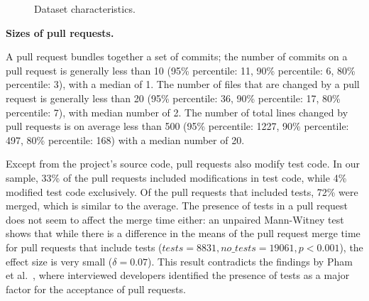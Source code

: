 \documentclass{sig-alternate}
\begin{document}

\begin{figure}
\centering
\caption{Dataset characteristics.}
\end{figure}

\textbf{Sizes of pull requests.}

A pull request bundles together a set of commits; the number of commits on a
pull request is generally less than 10 (95\% percentile: 11, 90\% percentile: 6,
80\% percentile: 3), with a median of 1. The number of files that are changed by
a pull request is generally less than 20 (95\% percentile: 36, 90\% percentile:
17, 80\% percentile: 7), with median number of 2. The number of total lines
changed by pull requests is on average less than 500 (95\% percentile: 1227,
90\% percentile: 497, 80\% percentile: 168) with a median number of 20.

Except from the project's source code, pull requests also modify test code. In
our sample, 33\% of the pull requests included modifications in test code, while
4\% modified test code exclusively. Of the pull requests that included tests,
72\% were merged, which is similar to the average. The presence of tests in a
pull request does not seem to affect the merge time either: an unpaired
Mann-Witney test shows that while there is a difference in the means of the pull
request merge time for pull requests that include tests ($tests = 8831, no\_tests
= 19061, p < 0.001$), the effect size is very small ($\delta = 0.07$). This
result contradicts the findings by Pham et al.~\cite{Pham13}, where
interviewed developers identified the presence of tests as a major factor for
the acceptance of pull requests.
\end{document}
